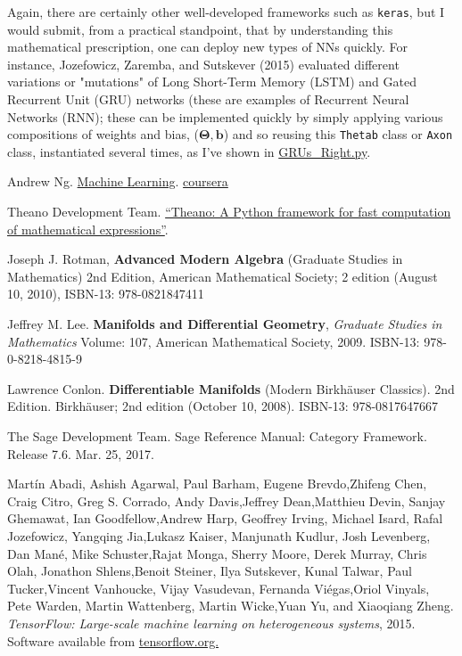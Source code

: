 \documentclass[10pt]{amsart}
\begin{document}
Again, there are certainly other well-developed frameworks such as \verb|keras|, but I would submit, from a practical standpoint, that by understanding this mathematical prescription, one can deploy new types of NNs quickly.  For instance, Jozefowicz, Zaremba, and Sutskever (2015)\cite{JZS2015} evaluated different variations or "mutations" of Long Short-Term Memory (LSTM) and Gated Recurrent Unit (GRU) networks (these are examples of Recurrent Neural Networks (RNN); these can be implemented quickly by simply applying various compositions of weights and bias, ($\mathbf{\Theta,b}$) and so reusing this \verb|Thetab| class or \verb|Axon| class, instantiated several times, as I've shown in \href{https://github.com/ernestyalumni/MLgrabbag/blob/master/ML/GRUs_Right.py}{GRUs_Right.py}.  

\begin{thebibliography}{9}

Andrew Ng.  \href{https://www.coursera.org/learn/machine-learning/home/welcome}{Machine Learning}.  \href{https://www.coursera.org}{coursera}

Theano Development Team. \href{http://arxiv.org/pdf/1605.02688.pdf}{“Theano: A Python framework for fast computation of mathematical expressions”}. 

Joseph J. Rotman, \textbf{Advanced Modern Algebra} (Graduate Studies in Mathematics) 2nd Edition, American Mathematical Society; 2 edition (August 10, 2010), ISBN-13: 978-0821847411

Jeffrey M. Lee. \textbf{Manifolds and Differential Geometry}, \emph{Graduate Studies in Mathematics} Volume: 107, American Mathematical Society, 2009. ISBN-13: 978-0-8218-4815-9

Lawrence Conlon.  \textbf{Differentiable Manifolds} (Modern Birkhäuser Classics).  2nd Edition.  Birkhäuser; 2nd edition (October 10, 2008).  ISBN-13: 978-0817647667

The Sage Development Team.  Sage Reference Manual: Category Framework.  Release 7.6.  Mar. 25, 2017.  

Martín Abadi, Ashish Agarwal, Paul Barham, Eugene Brevdo,Zhifeng Chen, Craig Citro, Greg S. Corrado, Andy Davis,Jeffrey Dean,Matthieu Devin, Sanjay Ghemawat, Ian Goodfellow,Andrew Harp, Geoffrey Irving, Michael Isard, Rafal Jozefowicz, Yangqing Jia,Lukasz Kaiser, Manjunath Kudlur, Josh Levenberg, Dan Mané, Mike Schuster,Rajat Monga, Sherry Moore, Derek Murray, Chris Olah, Jonathon Shlens,Benoit Steiner, Ilya Sutskever, Kunal Talwar, Paul Tucker,Vincent Vanhoucke, Vijay Vasudevan, Fernanda Viégas,Oriol Vinyals, Pete Warden, Martin Wattenberg, Martin Wicke,Yuan Yu, and Xiaoqiang Zheng.  
\emph{TensorFlow: Large-scale machine learning on heterogeneous systems}, 2015. Software available from \href{http://tensorflow.org/}{tensorflow.org.}


\end{thebibliography}
\end{document}
